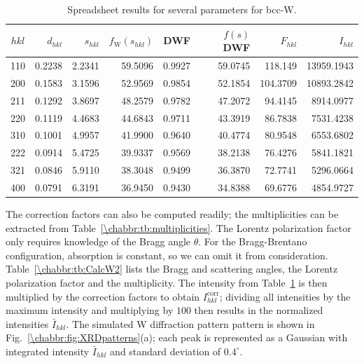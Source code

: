 \begin{table}[h!]
\centering\leavevmode
{\small\begin{tabular}{|crrrrrrr|}
\hline
$hkl$& $d_{hkl}$ & $s_{hkl}$ & $f_\text{W}(s_{hkl})$ & DWF & $f(s)$DWF & $F_{hkl}$ & $I_{hkl}$\\
\hline\hline
110 & 0.2238 & 2.2341 & 59.5096 & 0.9927 & 59.0745 & 118.149 & 13959.1943 \\
200 & 0.1583 & 3.1596 & 52.9569 & 0.9854 & 52.1854 & 104.3709 & 10893.2842 \\
211 & 0.1292 & 3.8697 & 48.2579 & 0.9782 & 47.2072 & 94.4145 & 8914.0977 \\
220 & 0.1119 & 4.4683 & 44.6843 & 0.9711 & 43.3919 & 86.7838 & 7531.4238 \\
310 & 0.1001 & 4.9957 & 41.9900 & 0.9640 & 40.4774 & 80.9548 & 6553.6802 \\
222 & 0.0914 & 5.4725 & 39.9337 & 0.9569 & 38.2138 & 76.4276 & 5841.1821 \\
321 & 0.0846 & 5.9110 & 38.3048 & 0.9499 & 36.3870 & 72.7741 & 5296.0664 \\
400 & 0.0791 & 6.3191 & 36.9450 & 0.9430 & 34.8388 & 69.6776 & 4854.9727 \\
\hline
\end{tabular}}
\caption{\label{\chabbr:tb:CalcW1}Spreadsheet results for several parameters for bcc-W.}
\end{table}

The correction factors can also be computed readily; the multiplicities can be extracted from Table~\ref{\chabbr:tb:multiplicities}. The Lorentz polarization factor only requires knowledge of the Bragg angle $\theta$. For the Bragg-Brentano configuration, absorption is constant, so we can omit it from consideration. Table~\ref{\chabbr:tb:CalcW2} lists the Bragg and scattering angles, the Lorentz polarization factor and the multiplicity.   The intensity from Table~\ref{\chabbr:tb:CalcW1} is then multiplied by the correction factors to obtain $I_{hkl}^{\text{corr}}$; dividing all intensities by the maximum intensity and multiplying by $100$ then results in the normalized intensities $\bar{I}_{hkl}$.  The simulated W diffraction pattern pattern is shown in Fig.~\ref{\chabbr:fig:XRDpatterns}(a); each peak is represented as a Gaussian with integrated intensity $\bar{I}_{hkl}$ and standard deviation of $0.4^{\circ}$.  

